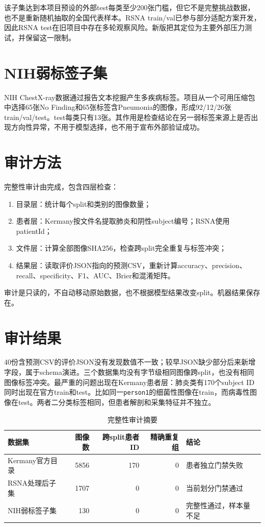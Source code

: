 该子集达到本项目预设的外部test每类至少200张门槛，但它不是完整挑战数据，也不是重新随机抽取的全国代表样本。RSNA train/val已参与部分适配方案开发，因此RSNA test在旧项目中存在多轮观察风险。新版把其定位为主要外部压力测试，并保留这一限制。

\section{NIH弱标签子集}

NIH ChestX-ray数据通过报告文本挖掘产生多疾病标签\cite{wang2017chestxray8}。项目从一个可用压缩包中选择65张No Finding和65张标签含Pneumonia的图像，形成92/12/26张train/val/test。test每类只有13张。其作用是检查结论在另一弱标签来源上是否出现方向性异常，不用于模型选择，也不用于宣布外部验证成功。

\section{审计方法}

完整性审计由完成，包含四层检查：
\begin{enumerate}
  \item 目录层：统计每个split和类别的图像数量；
  \item 患者层：Kermany按文件名提取肺炎和阴性subject编号；RSNA使用patientId；
  \item 文件层：计算全部图像SHA256，检查跨split完全重复与标签冲突；
  \item 结果层：读取评价JSON指向的预测CSV，重新计算accuracy、precision、recall、specificity、F1、AUC、Brier和混淆矩阵。
\end{enumerate}

审计是只读的，不自动移动原始数据，也不根据模型结果改变split。机器结果保存在。

\section{审计结果}

40份含预测CSV的评价JSON没有发现数值不一致；较早JSON缺少部分后来新增字段，属于schema演进。三个数据集均没有字节级相同图像跨split，也没有相同图像标签冲突。最严重的问题出现在Kermany患者层：肺炎类有170个subject ID同时出现在官方train和test。比如同一\texttt{person1}的细菌性图像在train，而病毒性图像在test。两者二分类标签相同，但患者解剖和采集特征并不独立。

\begin{table}[H]
\centering
\caption{完整性审计摘要}
\begin{tabularx}{\textwidth}{lrrrX}
\toprule 数据集 & 图像数 & 跨split患者ID & 精确重复组 & 结论\\\midrule
Kermany官方目录 & 5856 & 170 & 0 & 患者独立门禁失败\\
RSNA处理后子集 & 1707 & 0 & 0 & 当前划分门禁通过\\
NIH弱标签子集 & 130 & 0 & 0 & 完整性通过，样本量不足\\\bottomrule
\end{tabularx}
\end{table}

